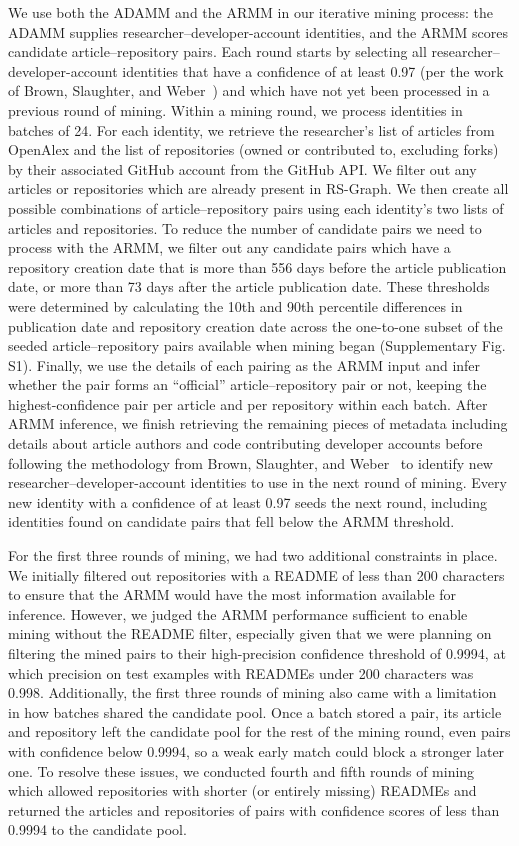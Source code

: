\documentclass[pdflatex,sn-nature]{sn-jnl}%
\begin{document}
We use both the ADAMM and the ARMM in our iterative mining process: the ADAMM supplies researcher--developer-account identities, and the ARMM scores candidate article--repository pairs.
Each round starts by selecting all researcher--developer-account identities that have a confidence of at least 0.97 (per the work of Brown, Slaughter, and Weber~\cite{brown2026code}) and which have not yet been processed in a previous round of mining.
Within a mining round, we process identities in batches of 24.
For each identity, we retrieve the researcher's list of articles from OpenAlex and the list of repositories (owned or contributed to, excluding forks) by their associated GitHub account from the GitHub API.
We filter out any articles or repositories which are already present in RS-Graph.
We then create all possible combinations of article--repository pairs using each identity's two lists of articles and repositories.
To reduce the number of candidate pairs we need to process with the ARMM, we filter out any candidate pairs which have a repository creation date that is more than 556 days before the article publication date, or more than 73 days after the article publication date.
These thresholds were determined by calculating the 10th and 90th percentile differences in publication date and repository creation date across the one-to-one subset of the seeded article--repository pairs available when mining began (Supplementary Fig. S1).
Finally, we use the details of each pairing as the ARMM input and infer whether the pair forms an ``official'' article--repository pair or not, keeping the highest-confidence pair per article and per repository within each batch.
After ARMM inference, we finish retrieving the remaining pieces of metadata including details about article authors and code contributing developer accounts before following the methodology from Brown, Slaughter, and Weber~\cite{brown2026code} to identify new researcher--developer-account identities to use in the next round of mining.
Every new identity with a confidence of at least 0.97 seeds the next round, including identities found on candidate pairs that fell below the ARMM threshold.

For the first three rounds of mining, we had two additional constraints in place.
We initially filtered out repositories with a README of less than 200 characters to ensure that the ARMM would have the most information available for inference.
However, we judged the ARMM performance sufficient to enable mining without the README filter, especially given that we were planning on filtering the mined pairs to their high-precision confidence threshold of 0.9994, at which precision on test examples with READMEs under 200 characters was 0.998.
Additionally, the first three rounds of mining also came with a limitation in how batches shared the candidate pool.
Once a batch stored a pair, its article and repository left the candidate pool for the rest of the mining round, even pairs with confidence below 0.9994, so a weak early match could block a stronger later one.
To resolve these issues, we conducted fourth and fifth rounds of mining which allowed repositories with shorter (or entirely missing) READMEs and returned the articles and repositories of pairs with confidence scores of less than 0.9994 to the candidate pool.
\end{document}
